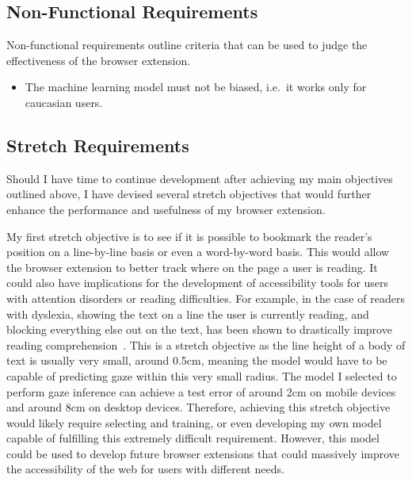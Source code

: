 \documentclass{report}
\begin{document}
\subsection{Non-Functional Requirements}

Non-functional requirements outline criteria that can be used to judge the effectiveness of the browser extension. 

\begin{itemize}
    \item The machine learning model must not be biased, i.e.~it works only for caucasian users. 
\end{itemize}

\subsection{Stretch Requirements}\label{ssec:stretch}

Should I have time to continue development after achieving my main objectives outlined above, I have devised several stretch objectives that would further enhance the performance and usefulness of my browser extension. 

My first stretch objective is to see if it is possible to bookmark the reader's position on a line-by-line basis or even a word-by-word basis. This would allow the browser extension to better track where on the page a user is reading. It could also have implications for the development of accessibility tools for users with attention disorders or reading difficulties. For example, in the case of readers with dyslexia, showing the text on a line the user is currently reading, and blocking everything else out on the text, has been shown to drastically improve reading comprehension~\cite{mutalib2022student}. This is a stretch objective as the line height of a body of text is usually very small, around 0.5cm, meaning the model would have to be capable of predicting gaze within this very small radius. The model I selected to perform gaze inference can achieve a test error of around 2cm on mobile devices and around 8cm on desktop devices. Therefore, achieving this stretch objective would likely require selecting and training, or even developing my own model capable of fulfilling this extremely difficult requirement. However, this model could be used to develop future browser extensions that could massively improve the accessibility of the web for users with different needs. 
\end{document}
